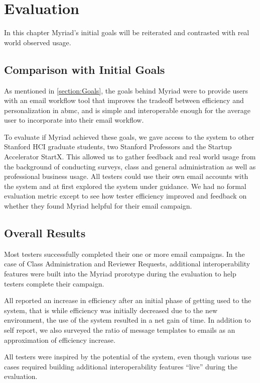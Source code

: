 \chapter{Evaluation}
\label{chapter:Evaluation}

In this chapter Myriad's initial goals will be reiterated and contrasted with real world observed usage.

\section{Comparison with Initial Goals}

As mentioned in \autoref{section:Goals}, the goals behind Myriad were to provide users with an email workflow tool that improves the tradeoff between efficiency and personalization in \gls{abmc}, and is simple and interoperable enough for the average user to incorporate into their email workflow.

To evaluate if Myriad achieved these goals, we gave access to the system to other Stanford HCI graduate students, two Stanford Professors and the Startup Accelerator StartX. This allowed us to gather feedback and real world usage from the background of conducting surveys, class and general administration as well as professional business usage.
All testers could use their own email accounts with the system and at first explored the system under guidance. We had no formal evaluation metric except to see how tester efficiency improved and feedback on whether they found Myriad helpful for their email campaign.

\section{Overall Results}

Most testers successfully completed their one or more email campaigns. In the case of Class Administration and Reviewer Requests, additional interoperability features were built into the Myriad prorotype during the evaluation to help testers complete their campaign.

All reported an increase in efficiency after an initial phase of getting used to the system, that is while efficiency was initially decreased due to the new environment, the use of the system resulted in a net gain of time.
In addition to self report, we also surveyed the ratio of message templates to emails as an approximation of efficiency increase.

All testers were inspired by the potential of the system, even though various use cases required building additional interoperability features ``live'' during the evaluation.

